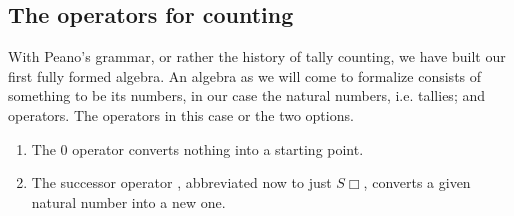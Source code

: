 
\subsection{The operators for counting}
With Peano's grammar, or rather the history of tally counting, we have 
built our first fully formed algebra.  An algebra as we will come to formalize 
consists of something to be its numbers, in our case the natural numbers, i.e. tallies;
and operators.  The operators in this case or the two options.
\begin{enumerate}
    \item The $0$ operator converts nothing into a starting point.  
    \item The successor operator , abbreviated now to just 
    $S\Box$, converts a given natural number into a new one.
\end{enumerate}

